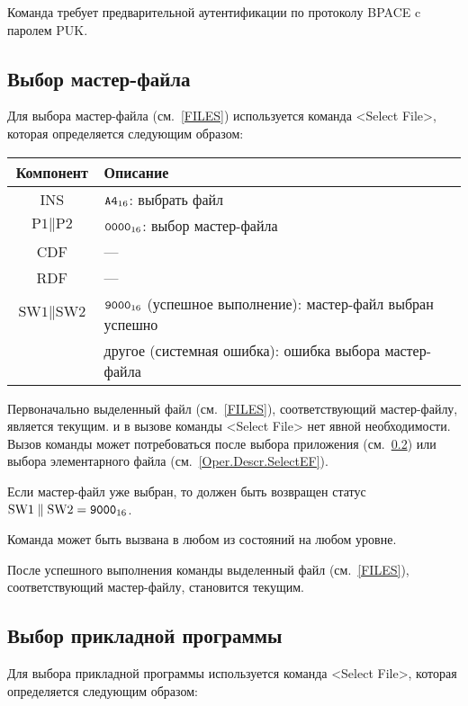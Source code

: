 Команда требует предварительной аутентификации по 
протоколу BPACE c паролем PUK.

\subsection{Выбор мастер-файла}
\label{Oper.Descr.SelectMF}

Для выбора мастер-файла (см.~\ref{FILES}) 
используется команда <Select File>, 
которая определяется следующим образом:

\noindent
\begin{tabular}{|c|p{14cm}|}
\hline
Компонент & Описание \\
\hline
\hline
INS & $\texttt{A4}_{16}$: выбрать файл\\ 
\hline
$\text{P1} \parallel \text{P2}$ & $\texttt{0000}_{16}$: выбор мастер-файла\\
\hline
CDF & --- \\
\hline \hline
RDF &  --- \\
\hline
$\text{SW1}\parallel\text{SW2}$ & 
$\texttt{9000}_{16}$ (успешное выполнение): мастер-файл выбран успешно\\
 & другое (системная ошибка): ошибка выбора мастер-файла\\
\hline
\end{tabular}

Первоначально выделенный файл (см.~\ref{FILES}), 
соответствующий мастер-файлу, является текущим.
и в вызове команды <Select File> нет явной необходимости. 
Вызов команды может потребоваться после 
выбора приложения (см.~\ref{Oper.Descr.SelectApp})
или выбора элементарного файла (см.~\ref{Oper.Descr.SelectEF}). 

Если мастер-файл уже выбран, то должен быть возвращен 
статус $\text{SW1} \parallel \text{SW2} = \texttt{9000}_{16}$.

Команда может быть вызвана в любом из состояний на 
любом уровне.

После успешного выполнения команды выделенный файл (см.~\ref{FILES}), 
соответствующий мастер-файлу, становится текущим.

\subsection{Выбор прикладной программы}
\label{Oper.Descr.SelectApp}

Для выбора прикладной программы используется 
команда <Select File>, 
которая определяется следующим образом:

